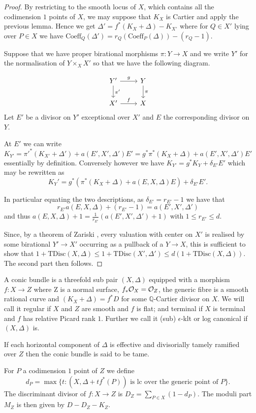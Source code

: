 \begin{proof}
	
	By restricting to the smooth locus of $X$, which contains all the codimension $1$ points of $X$, we may suppose that $K_{X}$ is Cartier and apply the previous lemma. Hence we get $\Delta'=f^{*}(K_{X}+\Delta)-K_{X'}$ where for $Q\in X'$ lying over $P\in X$ we have $\text{Coeff}_{Q}(\Delta')=r_{Q}(\text{Coeff}_{P}(\Delta))-(r_{Q}-1)$.
	
	Suppose that we have proper birational morphisms $\pi\colon Y \to X$ and we write $Y'$ for the normalisation of $Y\times_{X} X'$ so that we have the following diagram.
	
	\[\begin{tikzcd}
	Y' \arrow[d, "\pi'"] \arrow[r, "g"] & Y \arrow[d, "\pi"] \\
	X' \arrow[r, "f"]                   & X                 
	\end{tikzcd}\]
	Let $E'$ be a divisor on $Y'$ exceptional over $X'$ and $E$ the corresponding divisor on $Y$.
	
	At $E'$ we can write $$K_{Y'}= \pi'^{*}(K_{X'}+\Delta')+a(E',X',\Delta')E'=g^{*}\pi^{*}(K_{X}+\Delta)+a(E',X',\Delta')E'$$
	essentially by definition. Conversely however we have $K_{Y'}=g^{*}K_{Y}+\delta_{E'}E'$ which may be rewritten as 
	$$K_{Y}'=g^{*}(\pi^{*}(K_{X}+\Delta)+a(E,X,\Delta)E)+\delta_{E'}E'.$$
	
	In particular equating the two descriptions, as $\delta_{E'}=r_{E'}-1$ we have that
	\[r_{E'}a(E,X,\Delta)+(r_{E'}-1)=a(E',X',\Delta')\]
	and thus $a(E,X,\Delta)+1=\frac{1}{r_{E'}}(a(E',X',\Delta')+1)$ with $1 \leq r_{E'} \leq d$.
	
	Since, by a theorem of Zariski \cite[Theorem VI.1.3]{k-rat-curves}, every valuation with center on $X'$ is realised by some birational $Y' \to X'$ occurring as a pullback of a $Y \to X$, this is sufficient to show that $1+\text{TDisc}(X,\Delta) \leq 1+\text{TDisc}(X',\Delta') \leq d(1+\text{TDisc}(X,\Delta))$. The second part then follows.
\end{proof}


\begin{definition}
	A conic bundle is a threefold sub pair $(X,\Delta)$ equipped with a morphism $f\colon X \to Z$ where Z is a normal surface, $f_{*}\mathcal{O}_{X}=\mathcal{O}_{Z}$, the generic fibre is a smooth rational curve and $(K_{X}+\Delta)=f^{*}D$ for some $\mathbb{Q}$-Cartier divisor on $X$. We will call it regular if $X$ and $Z$ are smooth and $f$ is flat; and terminal if $X$ is terminal and $f$ has relative Picard rank $1$. Further we call it (sub) $\epsilon$-klt or log canonical if $(X,\Delta)$ is.
	
	If each horizontal component of $\Delta$ is effective and divisorially tamely ramified over $Z$ then the conic bundle is said to be tame.
	
	For $P$ a codimension $1$ point of $Z$ we define $$d_{P}=\max\{t\colon  (X,\Delta+tf^{*}(P)) \text{ is lc over the generic point of } P\}.$$
	The discriminant divisor of $f\colon X \to Z$ is $D_{Z}=\sum_{P \in X}(1-d_{P})$.
	The moduli part $M_{Z}$ is then given by $D-D_{Z}-K_{Z}$.
\end{definition}


